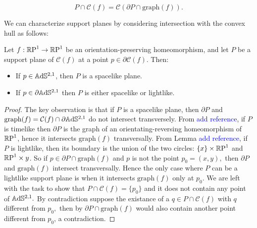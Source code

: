 \begin{equation}\label{suplane}
    P\cap\mathcal{C}(f)=\mathcal{C}(\partial P\cap\text{graph}(f)).
\end{equation}
    
We can characterize support planes by considering intersection with the convex hull as follows: 

\begin{proposition}\label{supportinho}
    Let $f:\S\to\S$ be an orientation-preserving homeomorphism, and let $P$ be a support plane of $\mathcal{C}(f)$ at a point $p\in\partial\mathcal{C}(f).$ Then:
    \begin{itemize}
        \item If $p\in\A^{2,1}$, then $P$ is a spacelike plane. 
        \item If $p\in\partial\A^{2,1}$ then $P$ is either spacelike or lightlike.
    \end{itemize}
\end{proposition}
\begin{proof}
    The key observation is that if $P$ is a spacelike plane, then $\partial P$ and $\text{graph}(f)=\mathcal{C}(f)\cap\partial\A^{2,1}$ do not intersect transversely. From \textcolor{blue}{add reference}, if $P$ is timelike then $\partial P$ is the graph of an orientating-reversing homeomorphism of $\S$, hence it intersects $\text{graph}(f)$ transversally. From Lemma \textcolor{blue}{add reference}, if $P$ is lightlike, then its boundary is the union of the two circles: $\{x\}\times\S$ and $\S\times{y}$. So if $p\in\partial P\cap\text{graph}(f)$ and $p$ is not the point $p_0=(x,y),$ then $\partial P$ and $\text{graph}(f)$ intersect transversally. Hence the only case where $P$ can be a lightlike support plane is when it intersects $\text{graph}(f)$ only at $p_0.$ We are left with the task to show that $P\cap\mathcal{C}(f)=\{p_0\}$ and it does not contain any point of $\A^{2,1}.$ By contradiction suppose the existance of a $q\in P\cap\mathcal{C}(f)$ with $q$ different from $p_0,$ then by  $\partial P\cap\text{graph}(f)$ would also contain another point different from $p_0$, a contradiction.
\end{proof}

